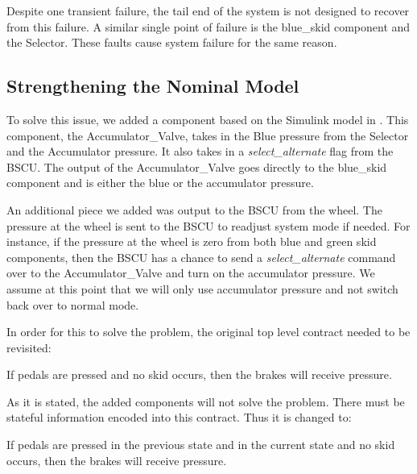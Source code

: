 Despite one transient failure, the tail end of the system is not designed to recover from this failure. A similar single point of failure is the blue\_skid component and the Selector. These faults cause system failure for the same reason. 

\subsection{Strengthening the Nominal Model}

To solve this issue, we added a component based on the Simulink model in \cite{Joshi05:Dasc}. This component, the Accumulator\_Valve, takes in the Blue pressure from the Selector and the Accumulator pressure. It also takes in a \textit{select\_alternate} flag from the BSCU. The output of the Accumulator\_Valve goes directly to the blue\_skid component and is either the blue or the accumulator pressure. 

An additional piece we added was output to the BSCU from the wheel. The pressure at the wheel is sent to the BSCU to readjust system mode if needed. For instance, if the pressure at the wheel is zero from both blue and green skid components, then the BSCU has a chance to send a \textit{select\_alternate} command over to the Accumulator\_Valve and turn on the accumulator pressure. We assume at this point that we will only use accumulator pressure and not switch back over to normal mode. 

In order for this to solve the problem, the original top level contract needed to be revisited: 

\begin{tt}
If pedals are pressed and no skid occurs, then the brakes will receive pressure. 
\end{tt}

As it is stated, the added components will not solve the problem. There must be stateful information encoded into this contract. Thus it is changed to: 

\begin{tt}
If pedals are pressed in the previous state and in the current state and no skid occurs, then the brakes will receive pressure. 
\end{tt}
















